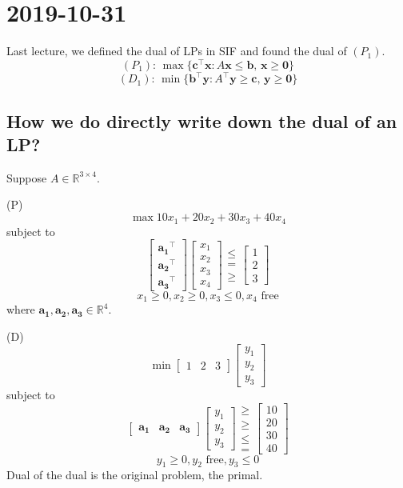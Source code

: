 \section{2019-10-31}
Last lecture, we defined the dual of LPs in SIF and found the dual of $ (P_1) $.
\[ (P_1):\, \max \{\bm{c}^\top \bm{x}: A \bm{x}\le \bm{b},\,\bm{x}\ge \bm{0}\}\]
\[ (D_1):\, \min\{ \bm{b}^\top \bm{y}: A ^\top \bm{y}\ge \bm{c},\,\bm{y}\ge \bm{0}\}\]

\subsection{How we do directly write down the dual of an LP?}
Suppose $ A\in\mathbb{R}^{3\times 4} $.

(P)
\[ \max 10x_1+20x_2+30x_3+40x_4 \]
subject to
\[ \begin{bmatrix}
    \bm{a_1}^\top\\
    \bm{a_2}^\top\\
    \bm{a_3}^\top
\end{bmatrix}
\begin{bmatrix}
    x_1\\
    x_2\\
    x_3\\
    x_4
\end{bmatrix}
\begin{matrix}
    \le\\
    =\\
    \ge
\end{matrix}
\begin{bmatrix}
    1\\
    2\\
    3
\end{bmatrix}\]
\[ x_1\ge 0, x_2\ge 0, x_3\le 0, x_4 \text{ free} \]
where $ \bm{a_1},\bm{a_2},\bm{a_3}\in \mathbb{R}^{4} $.

(D)
\[ \min \begin{bmatrix}
    1 & 2 & 3
\end{bmatrix}
\begin{bmatrix}
    y_1\\
    y_2\\
    y_3
\end{bmatrix}\]
subject to
\[ 
\begin{bmatrix}
    \bm{a_1} & \bm{a_2} & \bm{a_3}
\end{bmatrix}
\begin{bmatrix}
    y_1\\
    y_2\\
    y_3
\end{bmatrix}
\begin{matrix}
    \ge\\
    \ge\\
    \le\\
    =
\end{matrix}
\begin{bmatrix}
    10\\
    20\\
    30\\
    40
\end{bmatrix}\]
\[ y_1\ge 0, y_2 \text{ free}, y_3\le 0 \]
Dual of the dual is the original problem, the primal.

